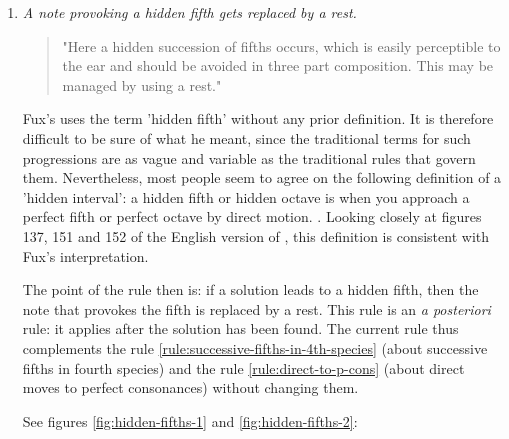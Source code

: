 \begin{enumerate}[wide, label=\bfseries 4.P\arabic*]
    \item \textit{A note provoking a hidden fifth gets replaced by a rest.} \label{rule:hidden-fifths}
    \begin{quotation}
        "Here a hidden succession of fifths occurs, which is easily perceptible to the ear and should be avoided in three part composition. This may be managed by using a rest."
        \textcite[p.98]{GaPEng}
    \end{quotation}
    Fux's uses the term 'hidden fifth' without any prior definition. It is therefore difficult to be sure of what he meant, since the traditional terms for such progressions are as vague and variable as the traditional rules that govern them. Nevertheless, most people seem to agree on the following definition of a 'hidden interval': a hidden fifth or hidden octave is when you approach a perfect fifth or perfect octave by direct motion. \cite[p.31]{piston1987harmony}. Looking closely at figures 137, 151 and 152 of the English version of \gap, this definition is consistent with Fux's interpretation.

    The point of the rule then is: if a solution leads to a hidden fifth, then the note that provokes the fifth is replaced by a rest. This rule is an \textit{a posteriori} rule: it applies after the solution has been found.
    The current rule thus complements the rule \ref{rule:successive-fifths-in-4th-species} (about successive fifths in fourth species) and the rule \ref{rule:direct-to-p-cons} (about direct moves to perfect consonances) without changing them.
    
    See figures \ref{fig:hidden-fifths-1} and \ref{fig:hidden-fifths-2}:


\end{enumerate}
